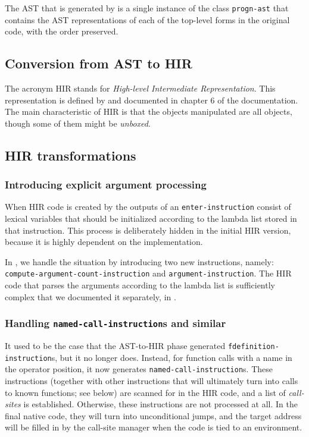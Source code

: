 The AST that is generated by \cleavir{} is a single instance of the
class \texttt{progn-ast} that contains the AST representations of each
of the top-level forms in the original code, with the order preserved.

\subsection{Conversion from AST to HIR}

The acronym HIR stands for \emph{High-level Intermediate
  Representation}.  This representation is defined by \cleavir{} and
documented in chapter 6 of the \cleavir{} documentation.
The main characteristic of HIR is that the objects manipulated are all
\commonlisp{} objects, though some of them might be \emph{unboxed}.

\subsection{HIR transformations}

\subsubsection{Introducing explicit argument processing}

When HIR code is created by \cleavir{} the outputs of an
\texttt{enter-instruction} consist of lexical variables that should be
initialized according to the lambda list stored in that instruction.
This process is deliberately hidden in the initial HIR version,
because it is highly dependent on the implementation.

In \sysname{}, we handle the situation by introducing two new
instructions, namely: \texttt{compute-argument-count-instruction} and
\texttt{argument-instruction}.  The HIR code that parses the arguments
according to the lambda list is sufficiently complex that we
documented it separately, in .

\subsubsection{Handling \texttt{named-call-instruction}s and similar}

It used to be the case that the AST-to-HIR phase generated
\texttt{fdefinition-instruction}s, but it no longer does.  Instead,
for function calls with a name in the operator position, it now
generates \texttt{named-call-instruction}s.  These instructions
(together with other instructions that will ultimately turn into calls
to known functions; see below) are scanned for in the HIR code, and a
list of \emph{call-sites} is established.  Otherwise, these
instructions are not processed at all.  In the final native code, they
will turn into unconditional jumps, and the target address will be
filled in by the call-site manager when the code is tied to an
environment.

